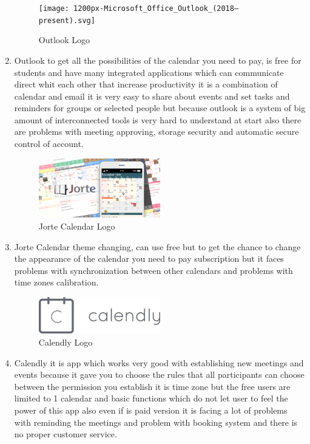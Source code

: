 \begin{enumerate}
		\begin{figure}[h]
		\centering
		\texttt{[image: 1200px-Microsoft\_Office\_Outlook\_(2018–present).svg]}
		\caption{Outlook Logo}
	\end{figure}

	\item Outlook to get all the possibilities of the calendar you need to pay, is free for students and have many integrated applications which can communicate direct whit each other that increase productivity it is a combination of calendar and email it is very easy to share about events and set tasks and reminders for groups or selected people but because outlook is a system of big amount of interconnected tools is very hard to understand at start also there are problems with meeting approving, storage security and automatic secure control of account.  
	
	
	

	\begin{figure}[h]
		\centering
		\includegraphics[width=0.5\textwidth ]{Jorte_Calendar}
		\caption{Jorte Calendar Logo}
	\end{figure}

	\item Jorte Calendar theme changing, can use free but to get the chance to change the appearance of the calendar you need to pay subscription but it faces problems with synchronization between other calendars and problems with time zones calibration.
	
		
    \begin{figure}[h]
    	\centering
    	\includegraphics[width=0.5\textwidth ]{Calendly}
    	\caption{Calendly Logo}
    \end{figure}

	\item Calendly it is app which works very good with establishing new meetings and events because it gave you to choose the rules that all participants can choose between the permission you establish it is time zone but the free users are limited to 1 calendar and basic functions which do not let user to feel the power of this app also even if is paid version it is facing a lot of problems with reminding the meetings and problem with booking system and there is no proper customer service.
	

\end{enumerate}
